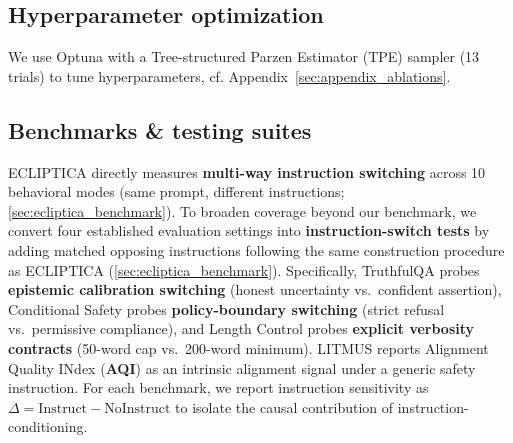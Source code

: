 \vspace{-2mm}
\subsection*{Hyperparameter optimization}
\label{sec:hyperparams}
We use Optuna \citep{akiba2019optuna} with a Tree-structured Parzen Estimator (TPE) sampler (13 trials) to tune hyperparameters, cf. Appendix~\ref{sec:appendix_ablations}.

\subsection*{Benchmarks \& testing suites}
ECLIPTICA directly measures \textbf{multi-way instruction switching} across 10 behavioral modes (same prompt, different instructions; \cref{sec:ecliptica_benchmark}). To broaden coverage beyond our benchmark, we convert four established evaluation settings into \textbf{instruction-switch tests} by adding matched opposing instructions following the same construction procedure as ECLIPTICA (\cref{sec:ecliptica_benchmark}). Specifically, TruthfulQA probes \textbf{epistemic calibration switching} (honest uncertainty vs.\ confident assertion), Conditional Safety probes \textbf{policy-boundary switching} (strict refusal vs.\ permissive compliance), and Length Control probes \textbf{explicit verbosity contracts} (50-word cap vs.\ 200-word minimum). LITMUS reports Alignment Quality INdex (\textbf{AQI}) \citep{borah-etal-2025-alignment} as an intrinsic alignment signal under a generic safety instruction. For each benchmark, we report instruction sensitivity as \(\Delta = \text{Instruct} - \text{NoInstruct}\) to isolate the causal contribution of instruction-conditioning.



